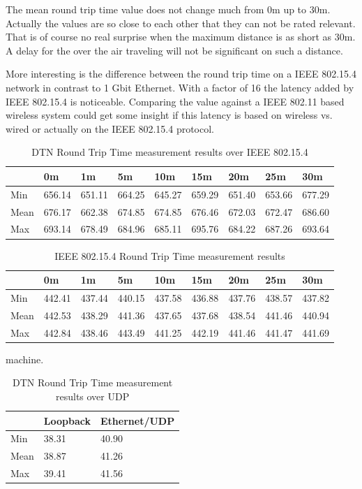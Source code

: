 The mean round trip time value does not change much from 0m up to 30m. Actually
the values are so close to each other that they can not be rated relevant. That
is of course no real surprise when the maximum distance is as short as 30m. A
delay for the over the air traveling will not be significant on such a distance.

More interesting is the difference between the round trip time on a IEEE
802.15.4 network in contrast to 1 Gbit Ethernet. With a factor of 16 the latency
added by IEEE 802.15.4 is noticeable. Comparing the value against a
IEEE 802.11 based wireless system could get some insight if this latency is based
on wireless vs. wired or actually on the IEEE 802.15.4 protocol.

\begin{table}
\begin{tabular}{lllllllll}
    & 0m & 1m & 5m & 10m & 15m & 20m & 25m & 30m \\
\hline
Min & 656.14 & 651.11 & 664.25 & 645.27 & 659.29 & 651.40 & 653.66 & 677.29 \\
Mean & 676.17 & 662.38 & 674.85 & 674.85 & 676.46 & 672.03 & 672.47 & 686.60 \\
Max & 693.14 & 678.49 & 684.96 & 685.11 & 695.76 & 684.22 & 687.26 & 693.64 \\
\end{tabular}
\caption{DTN Round Trip Time measurement results over IEEE 802.15.4}
\label{dtnrtt}
\end{table}

\begin{table}
\begin{tabular}{lllllllll}
    & 0m & 1m & 5m & 10m & 15m & 20m & 25m & 30m \\
\hline
Min & 442.41 & 437.44 & 440.15 & 437.58 & 436.88 & 437.76 & 438.57 & 437.82 \\
Mean & 442.53 & 438.29 & 441.36 & 437.65 & 437.68 & 438.54 & 441.46 & 440.94 \\
Max & 442.84 & 438.46 & 443.49 & 441.25 & 442.19 & 441.46 & 441.47 & 441.69 \\
\end{tabular}
\caption{IEEE 802.15.4 Round Trip Time measurement results}
\label{802154rtt}
\end{table}
machine.

\begin{table}
\begin{tabular}{lll}
    & Loopback & Ethernet/UDP \\
\hline
Min & 38.31 & 40.90 \\
Mean & 38.87 & 41.26 \\
Max & 39.41 & 41.56 \\
\end{tabular}
\caption{DTN Round Trip Time measurement results over UDP}
\label{dtnrtt2}
\end{table}

